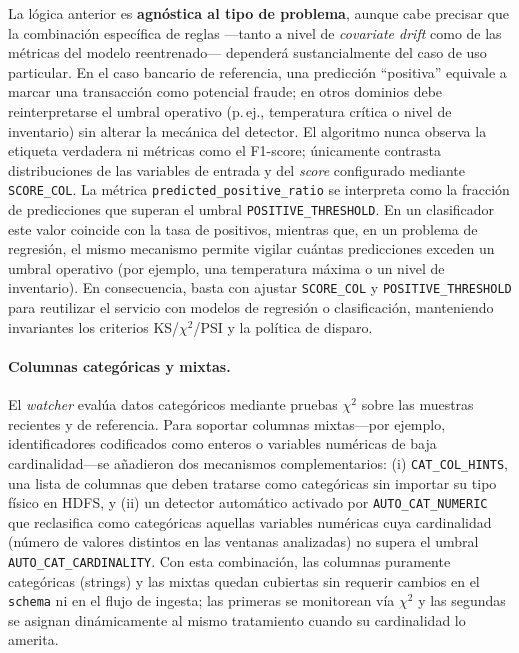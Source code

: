 La lógica anterior es \textbf{agnóstica al tipo de problema}, aunque cabe precisar que la combinación específica de reglas —tanto a nivel de \textit{covariate drift} como de las métricas del modelo reentrenado— dependerá sustancialmente del caso de uso particular. En el caso bancario de referencia, una predicción “positiva” equivale a marcar una transacción como potencial fraude; en otros dominios debe reinterpretarse el umbral operativo (p.\,ej., temperatura crítica o nivel de inventario) sin alterar la mecánica del detector. El algoritmo nunca observa la etiqueta verdadera ni métricas como el F1-score; únicamente contrasta distribuciones de las variables de entrada y del \textit{score} configurado mediante \texttt{SCORE\_COL}. La métrica \texttt{predicted\_positive\_ratio} se interpreta como la fracción de predicciones que superan el umbral \texttt{POSITIVE\_THRESHOLD}. En un clasificador este valor coincide con la tasa de positivos, mientras que, en un problema de regresión, el mismo mecanismo permite vigilar cuántas predicciones exceden un umbral operativo (por ejemplo, una temperatura máxima o un nivel de inventario). En consecuencia, basta con ajustar \texttt{SCORE\_COL} y \texttt{POSITIVE\_THRESHOLD} para reutilizar el servicio con modelos de regresión o clasificación, manteniendo invariantes los criterios KS/$\chi^2$/PSI y la política de disparo.

\paragraph{Columnas categóricas y mixtas.}
El \textit{watcher} evalúa datos categóricos mediante pruebas $\chi^2$ sobre las muestras recientes y de referencia. Para soportar columnas mixtas—por ejemplo, identificadores codificados como enteros o variables numéricas de baja cardinalidad—se añadieron dos mecanismos complementarios: (i) \texttt{CAT\_COL\_HINTS}, una lista de columnas que deben tratarse como categóricas sin importar su tipo físico en HDFS, y (ii) un detector automático activado por \texttt{AUTO\_CAT\_NUMERIC} que reclasifica como categóricas aquellas variables numéricas cuya cardinalidad (número de valores distintos en las ventanas analizadas) no supera el umbral \texttt{AUTO\_CAT\_CARDINALITY}. Con esta combinación, las columnas puramente categóricas (strings) y las mixtas quedan cubiertas sin requerir cambios en el \texttt{schema} ni en el flujo de ingesta; las primeras se monitorean vía $\chi^2$ y las segundas se asignan dinámicamente al mismo tratamiento cuando su cardinalidad lo amerita.

